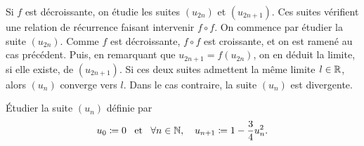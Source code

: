 \documentclass{magnoliaold}
\begin{document}
\begin{remarqueUnique}
\remarque Si $f$ est décroissante, on étudie les
      suites $(u_{2n})$ et $(u_{2n+1})$. Ces suites vérifient une relation de
      récurrence faisant intervenir $f\circ f$. On commence par étudier la suite $(u_{2n})$. Comme $f$ est décroissante, $f\circ f$ est croissante, et on est ramené au cas précédent. Puis, en remarquant que $u_{2n+1}=f(u_{2n})$, on en déduit la limite, si elle existe, de $(u_{2n+1})$. Si ces deux suites
      admettent la même limite $l\in\mathbb{R}$, alors $(u_n)$ converge vers $l$. Dans
      le cas contraire, la suite $(u_n)$ est divergente.
\end{remarqueUnique}


\begin{exoUnique}
\exo Étudier la suite $(u_n)$ définie par
\[u_0\coloneqq 0\quad\!\text{et}\quad\!\forall n\in\mathbb{N},\quad u_{n+1}\coloneqq 1-\frac{3}{4}u_n^2.\]
\begin{center}
\end{center}
\end{exoUnique}
\end{document}
